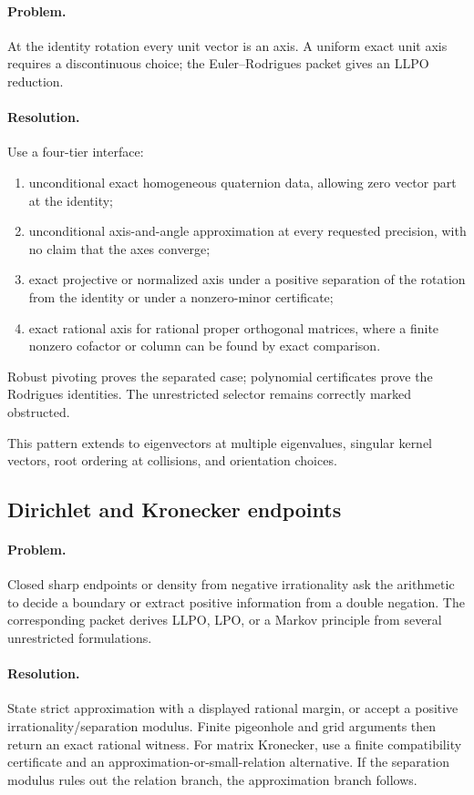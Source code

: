 \paragraph{Problem.}
At the identity rotation every unit vector is an axis.  A uniform exact unit
axis requires a discontinuous choice; the Euler--Rodrigues packet gives an
LLPO reduction.

\paragraph{Resolution.}
Use a four-tier interface:
\begin{enumerate}
\item unconditional exact homogeneous quaternion data, allowing zero vector
      part at the identity;
\item unconditional axis-and-angle approximation at every requested precision,
      with no claim that the axes converge;
\item exact projective or normalized axis under a positive separation of the
      rotation from the identity or under a nonzero-minor certificate;
\item exact rational axis for rational proper orthogonal matrices, where a
      finite nonzero cofactor or column can be found by exact comparison.
\end{enumerate}
Robust pivoting proves the separated case; polynomial certificates prove the
Rodrigues identities.  The unrestricted selector remains correctly marked
obstructed.

This pattern extends to eigenvectors at multiple eigenvalues, singular kernel
vectors, root ordering at collisions, and orientation choices.

\subsection{Dirichlet and Kronecker endpoints}

\paragraph{Problem.}
Closed sharp endpoints or density from negative irrationality ask the
arithmetic to decide a boundary or extract positive information from a double
negation.  The corresponding packet derives LLPO, LPO, or a Markov principle
from several unrestricted formulations.

\paragraph{Resolution.}
State strict approximation with a displayed rational margin, or accept a
positive irrationality/separation modulus.  Finite pigeonhole and grid
arguments then return an exact rational witness.  For matrix Kronecker, use a
finite compatibility certificate and an approximation-or-small-relation
alternative.  If the separation modulus rules out the relation branch, the
approximation branch follows.

